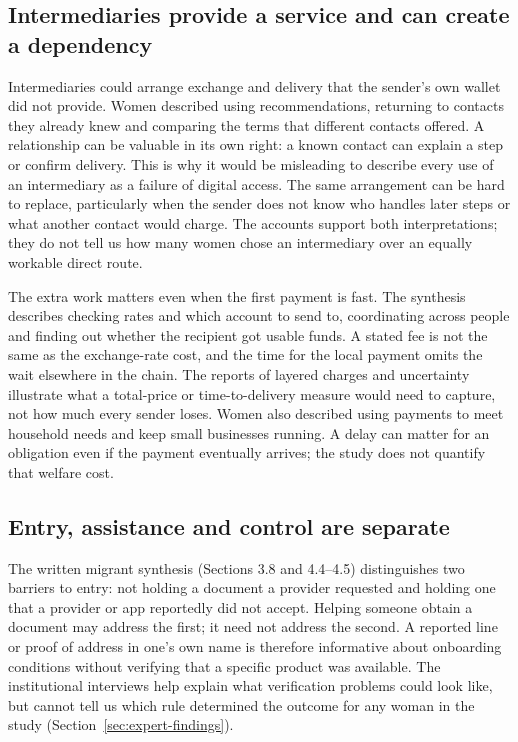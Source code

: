 \subsection{Intermediaries provide a service and can create a dependency}

Intermediaries could arrange exchange and delivery that the sender's own wallet did not provide. Women described using recommendations, returning to contacts they already knew and comparing the terms that different contacts offered. A relationship can be valuable in its own right: a known contact can explain a step or confirm delivery. This is why it would be misleading to describe every use of an intermediary as a failure of digital access. The same arrangement can be hard to replace, particularly when the sender does not know who handles later steps or what another contact would charge. The accounts support both interpretations; they do not tell us how many women chose an intermediary over an equally workable direct route.

The extra work matters even when the first payment is fast. The synthesis describes checking rates and which account to send to, coordinating across people and finding out whether the recipient got usable funds. A stated fee is not the same as the exchange-rate cost, and the time for the local payment omits the wait elsewhere in the chain. The reports of layered charges and uncertainty illustrate what a total-price or time-to-delivery measure would need to capture, not how much every sender loses. Women also described using payments to meet household needs and keep small businesses running. A delay can matter for an obligation even if the payment eventually arrives; the study does not quantify that welfare cost.

\subsection{Entry, assistance and control are separate}
\label{sec:migrant-control}

The written migrant synthesis (Sections 3.8 and 4.4--4.5) distinguishes two barriers to entry: not holding a document a provider requested and holding one that a provider or app reportedly did not accept. Helping someone obtain a document may address the first; it need not address the second. A reported line or proof of address in one's own name is therefore informative about onboarding conditions without verifying that a specific product was available. The institutional interviews help explain what verification problems could look like, but cannot tell us which rule determined the outcome for any woman in the study (Section~\ref{sec:expert-findings}).

